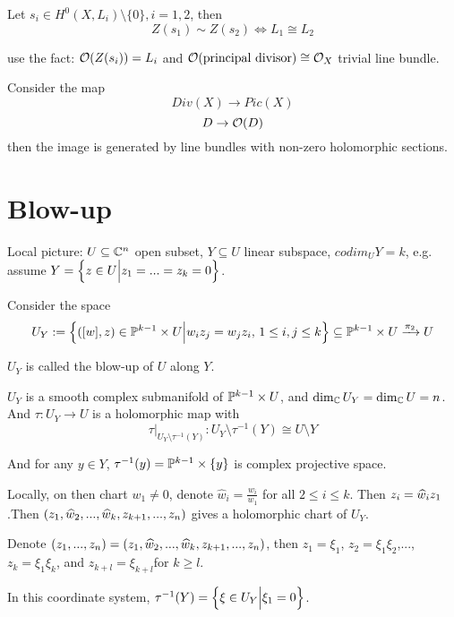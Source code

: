 \begin{cor}
Let $s_i\in H^0(X,L_i)\setminus\{0\},i=1,2$, then
$$Z(s_1)\sim Z(s_2)\iff L_1\cong L_2$$
\end{cor}
use the fact: $\mathcal{O}(Z(s_i))=L_i$ and $\mathcal{O}(\text{principal divisor})\cong\mathcal{O}_X$
trivial line bundle.

\begin{prop}
Consider the map
$$Div(X)\to Pic(X)$$
$$D\to\mathcal{O}(D)$$
then the image is generated by line bundles with non-zero holomorphic sections.
\end{prop}


\section{Blow-up}

Local picture: $U\subseteq\mathbb{C}^n$ open subset, $Y\subseteq U$
linear subspace, $codim_UY=k$, e.g. assume $Y=\Big\{ z\in U \Big| z_1=...=z_k=0 \Big\}$.

Consider the space
$$U_Y:=\Big\{ ([w],z)\in\mathbb{P}^{k-1}\times U \Big| w_iz_j=w_jz_i,\,1\leq i,j\leq k \Big\}
\subseteq\mathbb{P}^{k-1}\times U\xrightarrow{\pi_2}U$$

\begin{definition}
$U_Y$ is called the blow-up of $U$ along $Y$.
\end{definition}

\begin{prop}
$U_Y$ is a smooth complex submanifold of $\mathbb{P}^{k-1}\times U$, and
$\dim_{\mathbb{C}}U_Y=\dim_{\mathbb{C}}U=n$. And
$\tau:U_Y\to U$ is a holomorphic map with
$$
  \tau|_{U_Y\setminus\tau^{-1}(Y)}:
  U_Y\setminus\tau^{-1}(Y)\cong U\setminus Y
$$

And for any $y\in Y$, $\tau^{-1}(y)=\mathbb{P}^{k-1}\times\{y\}$
is complex projective space.

\end{prop}

Locally, on then chart $w_1\neq 0$, denote $\hat{w}_i=\frac{w_i}{w_1}$
for all $2\leq i\leq k$. Then $z_i=\widehat{w}_iz_1$.Then
$(z_1,\widehat{w}_2,...,\widehat{w}_k,z_{k+1},...,z_n)$ gives a holomorphic chart
of $U_Y$.

Denote $(z_1,...,z_n)=(z_1,\widehat{w}_2,...,\widehat{w}_k,z_{k+1},...,z_n)$,
then $z_1=\xi_1$, $z_2=\xi_1\xi_2$,...,$z_k=\xi_1\xi_k$, and
$z_{k+l}=\xi_{k+l}$for $k\geq l$.

In this coordinate system, $\tau^{-1}(Y)=
\Big\{ \xi\in U_Y \Big| \xi_1=0 \Big\}$.

